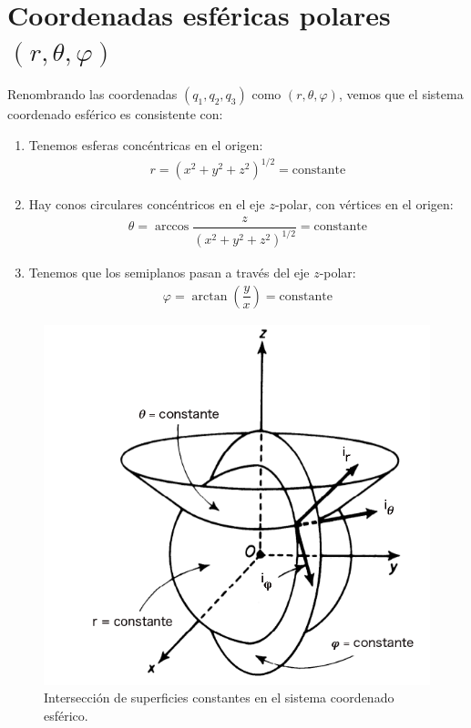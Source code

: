 \section{Coordenadas esféricas polares $(r,\theta, \varphi)$}
Renombrando las coordenadas $(q_{1}, q_{2}, q_{3})$ como $(r, \theta, \varphi)$, vemos que el sistema coordenado esférico es consistente con:
\begin{enumerate}
\item Tenemos esferas concéntricas en el origen:
\begin{align*}
r = (x^{2} + y^{2} + z^{2})^{1/2} =  \text{constante}
\end{align*}
\item Hay conos circulares concéntricos en el eje $z$-polar, con vértices en el origen:
\begin{align*}
\theta = \arccos \dfrac{z}{(x^{2} +y^{2} + z^{2})^{1/2}} = \text{constante}
\end{align*}
\item Tenemos que los semiplanos pasan a través del eje $z$-polar:
\begin{align*}
\varphi = \arctan\left(\dfrac{y}{x} \right) =  \text{constante}
\end{align*}
\end{enumerate}
\begin{figure}
    \centering
    \includegraphics[scale=0.5]{Imagenes/CoordenadasEsfericasSuperficiesConstantes.png}
    \caption{Intersección de superficies constantes en el sistema coordenado esférico.}
    \label{fig:figura_coordenadas_esfericas_superficies}
\end{figure}
